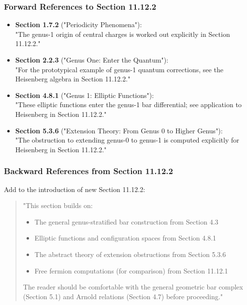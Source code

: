 \subsubsection{Forward References to Section 11.12.2}

\begin{itemize}
\item \textbf{Section 1.7.2} ("Periodicity Phenomena"): \\
  "The genus-1 origin of central charges is worked out explicitly in Section 11.12.2."

\item \textbf{Section 2.2.3} ("Genus One: Enter the Quantum"):\\
  "For the prototypical example of genus-1 quantum corrections, see the Heisenberg algebra in Section 11.12.2."

\item \textbf{Section 4.8.1} ("Genus 1: Elliptic Functions"):\\
  "These elliptic functions enter the genus-1 bar differential; see application to Heisenberg in Section 11.12.2."

\item \textbf{Section 5.3.6} ("Extension Theory: From Genus 0 to Higher Genus"):\\
  "The obstruction to extending genus-0 to genus-1 is computed explicitly for Heisenberg in Section 11.12.2."
\end{itemize}

\subsubsection{Backward References from Section 11.12.2}

Add to the introduction of new Section 11.12.2:

\begin{quote}
"This section builds on:
\begin{itemize}
\item The general genus-stratified bar construction from Section 4.3
\item Elliptic functions and configuration spaces from Section 4.8.1
\item The abstract theory of extension obstructions from Section 5.3.6
\item Free fermion computations (for comparison) from Section 11.12.1
\end{itemize}
The reader should be comfortable with the general geometric bar complex (Section 5.1) and Arnold relations (Section 4.7) before proceeding."
\end{quote}


